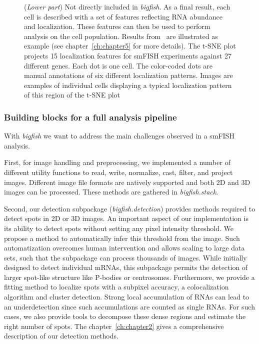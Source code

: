 \begin{figure}[]
{	(\textit{Lower part}) Not directly included in \emph{bigfish}.
	As a final result, each cell is described with a set of features reflecting RNA abundance and localization.
	These features can then be used to perform analysis on the cell population.
	Results from~\cite{CHOUAIB_2020} are illustrated as example (see chapter~\ref{ch:chapter5} for more details).
	The t-SNE plot projects 15 localization features for smFISH experiments against 27 different genes.
	Each dot is one cell.
	The color-coded dots are manual annotations of six different localization patterns.
	Images are examples of individual cells displaying a typical localization pattern of this region of the t-SNE plot}
    \label{fig:bigfish}
\end{figure}

\subsubsection{Building blocks for a full analysis pipeline}

With \emph{bigfish} we want to address the main challenges observed in a \ac{smFISH} analysis.

First, for image handling and preprocessing, we implemented a number of different utility functions to read, write, normalize, cast, filter, and project images.
Different image file formats are natively supported and both 2D and 3D images can be processed.
These methods are gathered in \emph{bigfish.stack}.

Second, our detection subpackage (\emph{bigfish.detection}) provides methods required to detect spots in 2D or 3D images.
An important aspect of our implementation is its ability to detect spots without setting any pixel intensity threshold.
We propose a method to automatically infer this threshold from the image.
Such automatization overcomes human intervention and allows scaling to large data sets, such that the subpackage can process thousands of images.
While initially designed to detect individual \ac{mRNA}s, this subpackage permits the detection of larger spot-like structure like P-bodies or centrosomes.
Furthermore, we provide a fitting method to localize spots with a subpixel accuracy, a colocalization algorithm and cluster detection.
Strong local accumulation of \ac{RNA}s can lead to an underdetection since such accumulations are counted as single \ac{RNA}s.
For such cases, we also provide tools to decompose these dense regions and estimate the right number of spots.
The chapter~\ref{ch:chapter2} gives a comprehensive description of our detection methods.

